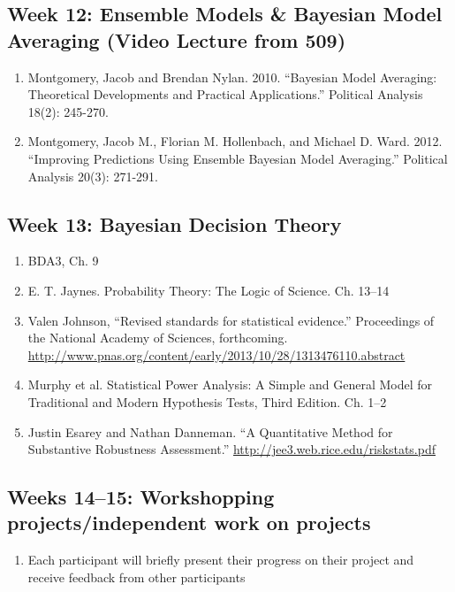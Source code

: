 \documentclass[11pt, leqno, fleqn]{article}
\begin{document}
\subsection*{Week 12: Ensemble Models \& Bayesian Model Averaging (Video Lecture from 509)}
	\begin{enumerate}
		\item[] Montgomery, Jacob and Brendan Nylan. 2010. ``Bayesian Model Averaging:
 Theoretical Developments and Practical Applications.'' Political Analysis 18(2):
 245-270.
 	\item[] Montgomery, Jacob M., Florian M. Hollenbach, and Michael D. Ward. 2012.
``Improving Predictions Using Ensemble Bayesian Model Averaging.''
Political Analysis 20(3): 271-291.
	\end{enumerate}
\subsection*{Week 13: Bayesian Decision Theory}
	\begin{enumerate}
	\item[] BDA3, Ch. 9
	\item[] E. T. Jaynes. Probability Theory: The Logic of Science. Ch. 13--14
	\item[] Valen Johnson, ``Revised standards for statistical evidence.'' Proceedings of the National Academy of Sciences, forthcoming. \url{http://www.pnas.org/content/early/2013/10/28/1313476110.abstract}
	\item[] Murphy et al. Statistical Power Analysis: A Simple and General Model for Traditional and Modern Hypothesis Tests, Third Edition. Ch. 1--2
	\item[] Justin Esarey and Nathan Danneman. ``A Quantitative Method for Substantive Robustness Assessment.'' \url{http://jee3.web.rice.edu/riskstats.pdf}
	\end{enumerate}
\subsection*{Weeks 14--15: Workshopping projects/independent work on projects}
	\begin{enumerate}
	\item[] Each participant will briefly present their progress on their project and receive feedback from other participants
	\end{enumerate}
\end{document}
